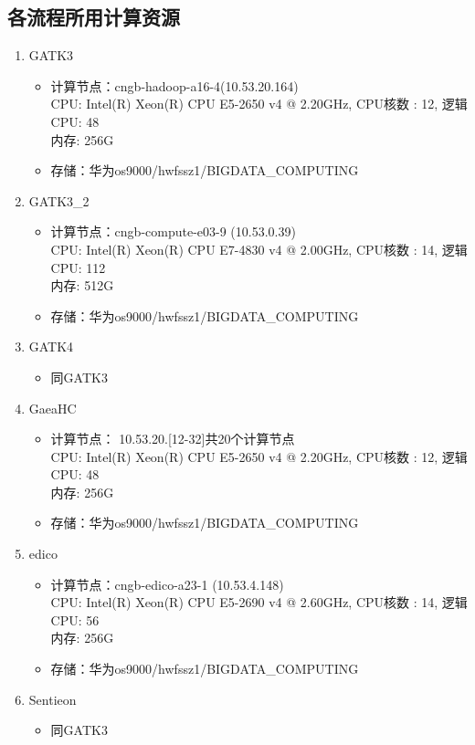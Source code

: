 \documentclass[UTF8,10pt,a4paper]{ctexart}
\begin{document}
\subsection{各流程所用计算资源}
\begin{enumerate}
\item GATK3
	\begin{itemize}
	\item 计算节点：cngb-hadoop-a16-4(10.53.20.164)\\
	 CPU: Intel(R) Xeon(R) CPU E5-2650 v4 @ 2.20GHz, CPU核数 : 12,  逻辑CPU: 48\\
	 内存: 256G
	\item 存储：华为os9000/hwfssz1/BIGDATA\_COMPUTING
	\end{itemize}
\item GATK3\_2
	\begin{itemize}
	\item 计算节点：cngb-compute-e03-9 (10.53.0.39)\\
	 CPU: Intel(R) Xeon(R) CPU E7-4830 v4 @ 2.00GHz, CPU核数 : 14,  逻辑CPU: 112\\
	 内存: 512G
	\item 存储：华为os9000/hwfssz1/BIGDATA\_COMPUTING
	\end{itemize}

\item GATK4
\begin{itemize}
 \item 同GATK3
\end{itemize}

\item GaeaHC
	\begin{itemize}
	\item 计算节点： 10.53.20.[12-32]共20个计算节点\\
	 CPU: Intel(R) Xeon(R) CPU E5-2650 v4 @ 2.20GHz, CPU核数 : 12,  逻辑CPU: 48\\
	 内存: 256G
	\item 存储：华为os9000/hwfssz1/BIGDATA\_COMPUTING
	\end{itemize}

\item edico 
      \begin{itemize}
      \item 计算节点：cngb-edico-a23-1 (10.53.4.148)\\
         CPU: Intel(R) Xeon(R) CPU E5-2690 v4 @ 2.60GHz, CPU核数 : 14,  逻辑CPU: 56\\
	 内存: 256G
	\item 存储：华为os9000/hwfssz1/BIGDATA\_COMPUTING
	\end{itemize}

\item Sentieon
\begin{itemize}
 \item 同GATK3
\end{itemize}
\end{enumerate}
\end{document}
